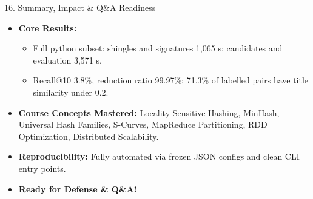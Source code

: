 \documentclass[aspectratio=169,10pt]{beamer}
\begin{document}
\begin{frame}{16. Summary, Impact \& Q\&A Readiness}
  \begin{itemize}
    \item \textbf{Core Results:}
      \begin{itemize}
        \item Full python subset: shingles and signatures 1,065 s; candidates and evaluation 3,571 s.
        \item Recall@10 3.8\%, reduction ratio 99.97\%; 71.3\% of labelled pairs have title similarity under 0.2.
      \end{itemize}
    \item \textbf{Course Concepts Mastered:} Locality-Sensitive Hashing, MinHash, Universal Hash Families, S-Curves, MapReduce Partitioning, RDD Optimization, Distributed Scalability.
    \item \textbf{Reproducibility:} Fully automated via frozen JSON configs and clean CLI entry points.
    \item \textbf{Ready for Defense \& Q\&A!}
  \end{itemize}
\end{frame}
\end{document}
